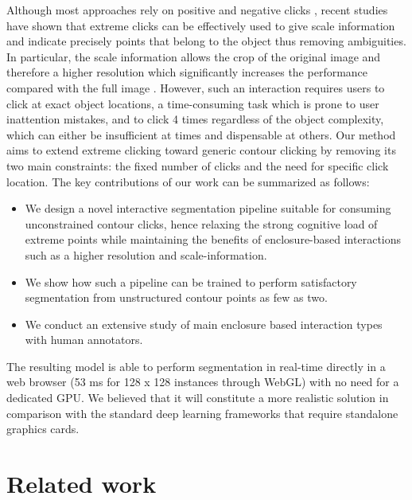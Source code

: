 \documentclass[letterpaper, 10 pt, conference]{ieeeconf}
\begin{document}
Although most approaches rely on positive and negative clicks \cite{xu16, li18, mahadevan18, majumder19}, recent studies have shown that extreme clicks \cite{papadopoulos17,maninis18} can be effectively used to give scale information and indicate precisely points that belong to the object thus removing ambiguities. In particular, the scale information allows the crop of the original image and therefore a higher resolution which significantly increases the performance compared with the full image \cite{maninis18}.
However, such an interaction requires users to click at exact object locations, a time-consuming task which is prone to user inattention mistakes, and to click 4 times regardless of the object complexity, which can either be insufficient at times and dispensable at others.
Our method aims to extend extreme clicking toward generic contour clicking by removing its two main constraints: the fixed number of clicks and the need for specific click location. The key contributions of our work can be summarized as follows:
\begin{itemize}
  \item We design a novel interactive segmentation pipeline suitable for consuming unconstrained contour clicks, hence relaxing the strong cognitive load of extreme points while maintaining the benefits of enclosure-based interactions such as a higher resolution and scale-information.
  \item We show how such a pipeline can be trained to perform satisfactory segmentation from unstructured contour points as few as two.
  \item We conduct an extensive study of main enclosure based interaction types with human annotators.
\end{itemize}

The resulting model is able to perform segmentation in real-time directly in a web browser (53 ms for 128 x 128 instances through WebGL) with no need for a dedicated GPU. We believed that it will constitute a more realistic solution in comparison with the standard deep learning frameworks that require standalone graphics cards.

\section{Related work}
\end{document}

